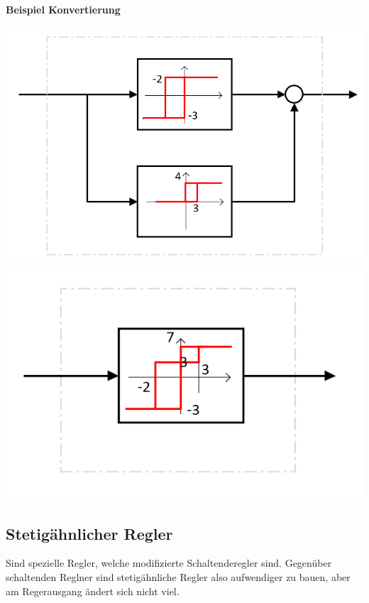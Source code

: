 \textbf{Beispiel Konvertierung}
\begin{center}
	\includegraphics[width=0.5\columnwidth]{Images/3pr_I}
\includegraphics[width=0.4\columnwidth]{Images/3pr_II}
\end{center}


\subsection{Stetigähnlicher Regler}
Sind spezielle Regler, welche modifizierte Schaltenderegler sind. Gegenüber schaltenden Reglner sind stetigähnliche Regler also aufwendiger zu bauen, aber am Regerausgang ändert sich nicht viel.